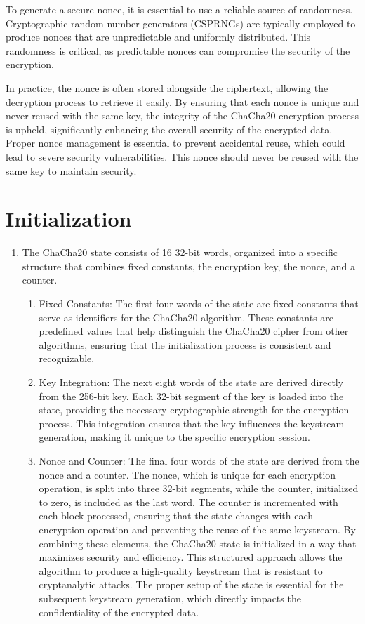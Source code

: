 \documentclass[a4paper,12pt]{report}
\begin{document}
\begin{enumerate}
    To generate a secure nonce, it is essential to use a reliable source of randomness.
    Cryptographic random number generators (CSPRNGs) are typically employed to produce nonces that are unpredictable and uniformly distributed.
    This randomness is critical, as predictable nonces can compromise the security of the encryption.

    In practice, the nonce is often stored alongside the ciphertext, allowing the decryption process to retrieve it easily.
    By ensuring that each nonce is unique and never reused with the same key, the integrity of the ChaCha20 encryption process is upheld, significantly enhancing the overall security of the encrypted data.
    Proper nonce management is essential to prevent accidental reuse, which could lead to severe security vulnerabilities.
   This nonce should never be reused with the same key to maintain security.
\end{enumerate}

\section{Initialization}
\begin{enumerate}
    \item The ChaCha20 state consists of 16 32-bit words, organized into a specific structure that combines fixed constants, the encryption key, the nonce, and a counter.
    \begin{enumerate}
        \item Fixed Constants: The first four words of the state are fixed constants that serve as identifiers for the ChaCha20 algorithm.
    These constants are predefined values that help distinguish the ChaCha20 cipher from other algorithms, ensuring that the initialization process is consistent and recognizable.
\item Key Integration: The next eight words of the state are derived directly from the 256-bit key.
    Each 32-bit segment of the key is loaded into the state, providing the necessary cryptographic strength for the encryption process.
    This integration ensures that the key influences the keystream generation, making it unique to the specific encryption session.
\item Nonce and Counter: The final four words of the state are derived from the nonce and a counter.
    The nonce, which is unique for each encryption operation, is split into three 32-bit segments, while the counter, initialized to zero, is included as the last word.
    The counter is incremented with each block processed, ensuring that the state changes with each encryption operation and preventing the reuse of the same keystream.
    By combining these elements, the ChaCha20 state is initialized in a way that maximizes security and efficiency.
    This structured approach allows the algorithm to produce a high-quality keystream that is resistant to cryptanalytic attacks.
    The proper setup of the state is essential for the subsequent keystream generation, which directly impacts the confidentiality of the encrypted data.
\end{enumerate}
\end{enumerate}
\end{document}
